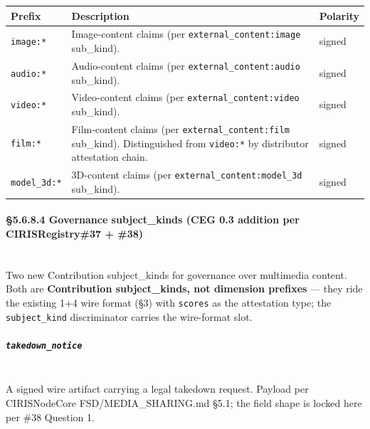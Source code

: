 \documentclass[11pt]{article}
\begin{document}
{\footnotesize
\begin{longtable}{|p{5.33cm}|p{5.33cm}|p{5.33cm}|}\hline
\textbf{Prefix} & \textbf{Description} & \textbf{Polarity} \\ \hline\endhead
\texttt{image:*} & Image-content claims (per \texttt{external\_content:image} sub\_kind). & signed \\ \hline
\texttt{audio:*} & Audio-content claims (per \texttt{external\_content:audio} sub\_kind). & signed \\ \hline
\texttt{video:*} & Video-content claims (per \texttt{external\_content:video} sub\_kind). & signed \\ \hline
\texttt{film:*} & Film-content claims (per \texttt{external\_content:film} sub\_kind). Distinguished from \texttt{video:*} by distributor attestation chain. & signed \\ \hline
\texttt{model\_3d:*} & 3D-content claims (per \texttt{external\_content:model\_3d} sub\_kind). & signed \\ \hline
\end{longtable}}


\paragraph{§5.6.8.4 Governance subject\_kinds (CEG 0.3 addition per CIRISRegistry\#37 + \#38)}\mbox{}\\


Two new Contribution subject\_kinds for governance over multimedia content. Both are \textbf{Contribution subject\_kinds, not dimension prefixes} — they ride the existing 1+4 wire format (§3) with \texttt{scores} as the attestation type; the \texttt{subject\_kind} discriminator carries the wire-format slot.


\subparagraph{\texttt{takedown\_notice}}\mbox{}\\


A signed wire artifact carrying a legal takedown request. Payload per CIRISNodeCore FSD/MEDIA\_SHARING.md §5.1; the field shape is locked here per \#38 Question 1.
\end{document}
